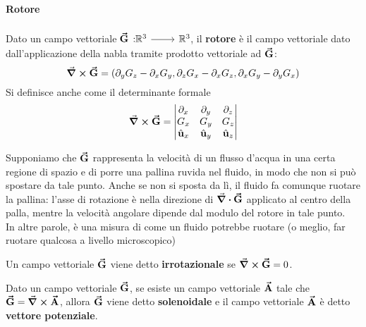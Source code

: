\paragraph{Rotore}
\begin{define}[Rotore]
	Dato un campo vettoriale $\funz[\vba{G}]{\realset^3}{\realset^3}$, il \textbf{rotore} è il campo vettoriale dato dall'applicazione della nabla tramite prodotto vettoriale ad $\vb*{\va{G}}$:
	\begin{equation}
		\curl{\vb*{\va{G}}}=(\partial_yG_z-\partial_xG_y,\partial_zG_x-\partial_xG_z,\partial_xG_y-\partial_yG_x)
	\end{equation}
	Si definisce anche come il determinante formale
	\begin{equation}
		\curl{\vb*{\va{G}}}=\begin{vmatrix}
			\partial_x & \partial_y & \partial_z\\
			G_x & G_y & G_z\\
			\hat{\mathbf{u}}_x & \hat{\mathbf{u}}_y & \hat{\mathbf{u}}_z
		\end{vmatrix}
	\end{equation}
\end{define}
\begin{example}
	Supponiamo che $\vb*{\va{G}}$ rappresenta la velocità di un flusso d'acqua in una certa regione di spazio e di porre una pallina ruvida nel fluido, in modo che non si può spostare da tale punto. Anche se non si sposta da lì, il fluido fa comunque ruotare la pallina: l'asse di rotazione è nella direzione di $\grad \vdot \vba{G}$ applicato al centro della palla, mentre la velocità angolare dipende dal modulo del rotore in tale punto.\\
	In altre parole, è una misura di come un fluido potrebbe ruotare (o meglio, far ruotare qualcosa a livello microscopico)
\end{example}
\begin{define}
	Un campo vettoriale $\vb*{\va{G}}$ viene detto \textbf{irrotazionale} se $\curl{\vb*{\va{G}}}=0$.
\end{define}
\begin{define}
	Dato un campo vettoriale $\vb*{\va{G}}$, se esiste un campo vettoriale $\vb*{\va{A}}$ tale che $\vb*{\va{G}}=\curl{\vb*{\va{A}}}$, allora $\vb*{\va{G}}$ viene detto \textbf{solenoidale} e il campo vettoriale $\vb*{\va{A}}$ è detto \textbf{vettore potenziale}.
\end{define}
